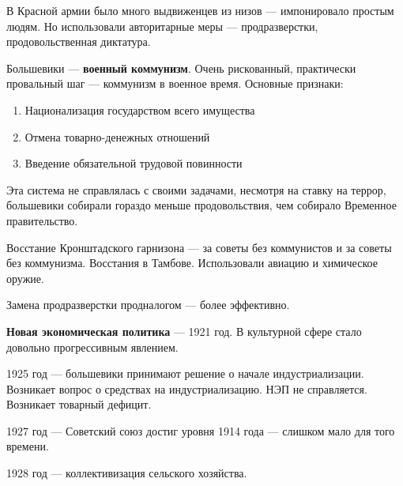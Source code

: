 \documentclass{article}
\begin{document}
В Красной армии было много выдвиженцев из низов — импонировало простым людям. Но использовали авторитарные меры — продразверстки, продовольственная диктатура.

Большевики — \textbf{военный коммунизм}. Очень рискованный, практически провальный шаг — коммунизм в военное время. Основные признаки:

\begin{enumerate}
    \item Национализация государством всего имущества
    \item Отмена товарно-денежных отношений
    \item Введение обязательной трудовой повинности
\end{enumerate}

Эта система не справлялась с своими задачами, несмотря на ставку на террор, большевики собирали гораздо меньше продовольствия, чем собирало Временное правительство.

Восстание Кронштадского гарнизона — за советы без коммунистов и за советы без коммунизма. Восстания в Тамбове. Использовали авиацию и химическое оружие.

Замена продразверстки продналогом — более эффективно.

\hfill

\textbf{Новая экономическая политика} — 1921 год. В культурной сфере стало довольно прогрессивным явлением.

1925 год — большевики принимают решение о начале индустриализации. Возникает вопрос о средствах на индустриализацию. НЭП не справляется. Возникает товарный дефицит.

1927 год — Советский союз достиг уровня 1914 года — слишком мало для того времени.

1928 год — коллективизация сельского хозяйства.
\end{document}
